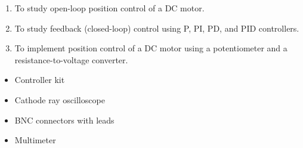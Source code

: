 
\begin{objectives}
  \begin{enumerate}
    \item To study open-loop position control of a DC motor.
    \item To study feedback (closed-loop) control using P, PI, PD, and PID controllers.
    \item To implement position control of a DC motor using a potentiometer and a resistance-to-voltage converter.
  \end{enumerate}
\end{objectives}

\begin{equipment}
  \begin{itemize}
    \item Controller kit
    \item Cathode ray oscilloscope
    \item BNC connectors with leads
    \item Multimeter
  \end{itemize}
\end{equipment}


